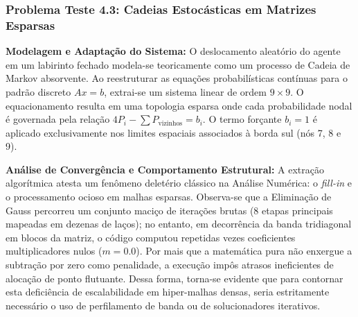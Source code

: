 \subsubsection{Problema Teste 4.3: Cadeias Estocásticas em Matrizes Esparsas}

\textbf{Modelagem e Adaptação do Sistema:} O deslocamento aleatório do agente em um labirinto fechado modela-se teoricamente como um processo de Cadeia de Markov absorvente. Ao reestruturar as equações probabilísticas contínuas para o padrão discreto $Ax=b$, extrai-se um sistema linear de ordem $9 \times 9$. O equacionamento resulta em uma topologia esparsa onde cada probabilidade nodal é governada pela relação $4P_i - \sum P_{\text{vizinhos}} = b_i$. O termo forçante $b_i = 1$ é aplicado exclusivamente nos limites espaciais associados à borda sul (nós 7, 8 e 9).

\begin{table}[H]
\centering
\caption{Registros Críticos do Preenchimento de Zeros (Problema 4.3 - Gauss)}
\label{tab:gauss_prob43}
\end{table}

\textbf{Análise de Convergência e Comportamento Estrutural:} A extração algorítmica atesta um fenômeno deletério clássico na Análise Numérica: o \textit{fill-in} e o processamento ocioso em malhas esparsas. Observa-se que a Eliminação de Gauss percorreu um conjunto maciço de iterações brutas (8 etapas principais mapeadas em dezenas de laços); no entanto, em decorrência da banda tridiagonal em blocos da matriz, o código computou repetidas vezes coeficientes multiplicadores nulos ($m = 0.0$). Por mais que a matemática pura não enxergue a subtração por zero como penalidade, a execução impôs atrasos ineficientes de alocação de ponto flutuante. Dessa forma, torna-se evidente que para contornar esta deficiência de escalabilidade em hiper-malhas densas, seria estritamente necessário o uso de perfilamento de banda ou de solucionadores iterativos.

